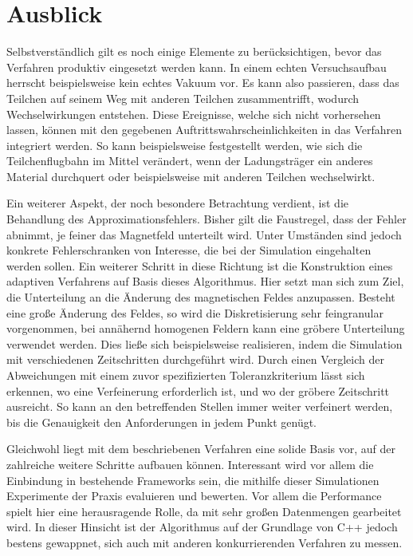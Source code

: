 \chapter{Ausblick}

Selbstverst\"andlich gilt es noch einige Elemente zu ber\"ucksichtigen, bevor das Verfahren produktiv eingesetzt werden kann.
In einem echten Versuchsaufbau herrscht beispielsweise kein echtes Vakuum vor. Es kann also passieren, dass das Teilchen auf seinem
Weg mit anderen Teilchen zusammentrifft, wodurch Wechselwirkungen entstehen. Diese Ereignisse, welche
sich nicht vorhersehen lassen, k\"onnen mit den gegebenen Auftrittswahrscheinlichkeiten in das Verfahren integriert werden. So kann beispielsweise festgestellt werden, wie sich die Teilchenflugbahn im Mittel ver\"andert,
wenn der Ladungstr\"ager ein anderes Material durchquert oder beispielsweise mit anderen Teilchen wechselwirkt.

Ein weiterer Aspekt, der noch besondere Betrachtung verdient, ist die Behandlung des Approximationsfehlers. Bisher gilt die Faustregel, dass
der Fehler abnimmt, je feiner das Magnetfeld unterteilt wird. Unter Umst\"anden sind jedoch konkrete Fehlerschranken von Interesse, die bei der
Simulation eingehalten werden sollen. Ein weiterer Schritt in diese Richtung ist die Konstruktion eines adaptiven Verfahrens auf Basis dieses Algorithmus.
Hier setzt man sich zum Ziel, die Unterteilung an die \"Anderung des magnetischen Feldes anzupassen. Besteht eine
gro{\ss}e \"Anderung des Feldes, so wird die Diskretisierung sehr feingranular vorgenommen, bei ann\"ahernd homogenen Feldern kann
eine gr\"obere Unterteilung verwendet werden. Dies lie{\ss}e sich beispielsweise realisieren, indem die Simulation mit
verschiedenen Zeitschritten durchgef\"uhrt wird. Durch einen Vergleich der Abweichungen mit einem zuvor spezifizierten
Toleranzkriterium l\"asst sich erkennen, wo eine Verfeinerung erforderlich ist, und wo der gr\"obere Zeitschritt ausreicht.
So kann an den betreffenden Stellen immer weiter verfeinert werden, bis die Genauigkeit den Anforderungen in jedem Punkt gen\"ugt.

Gleichwohl liegt mit dem beschriebenen Verfahren eine solide Basis vor, auf der zahlreiche weitere Schritte aufbauen k\"onnen. Interessant
wird vor allem die Einbindung in bestehende Frameworks sein, die mithilfe dieser Simulationen Experimente der Praxis evaluieren und bewerten.
Vor allem die Performance spielt hier eine herausragende Rolle, da mit sehr gro{\ss}en Datenmengen gearbeitet wird. In dieser Hinsicht ist der
Algorithmus auf der Grundlage von C++ jedoch bestens gewappnet, sich auch  mit anderen konkurrierenden Verfahren zu messen.
